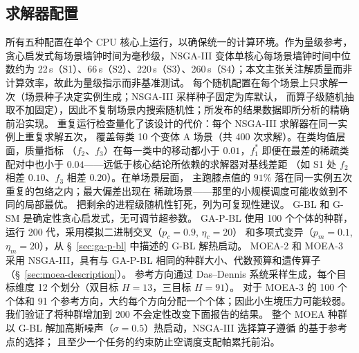\documentclass[preprint,12pt,authoryear]{elsarticle}
\begin{document}
\subsection{求解器配置}
所有五种配置在单个 CPU 核心上运行，以确保统一的计算环境。作为量级参考，贪心启发式每场景墙钟时间为毫秒级，NSGA-III 变体单核心每场景墙钟时间中位数约为 22\,s（S1）、66\,s（S2）、220\,s（S3）、260\,s（S4）；本文主张关注解质量而非计算效率，故此为量级指示而非基准测试。
每个随机配置在每个场景上只求解一次（场景种子决定实例生成；NSGA-III 采样种子固定为库默认，
而算子级随机抽取不加固定），因此不复制场景内搜索随机性；所发布的结果数据即所分析的精确前沿实现。
重复运行检查量化了该设计的代价：每个 NSGA-III 求解器在同一实例上重复求解五次，
覆盖每类 10 个变体 A 场景（共 400 次求解）。在类均值层面，质量指标
（$f_2$、$f_3$）在每一类中的移动都小于 $0.01$，$f_1^*$ 即便在最差的稀疏类
配对中也小于 $0.04$——远低于核心结论所依赖的求解器对基线差距
（如 S1 处 $f_2$ 相差 $0.10$、$f_3$ 相差 $0.20$）。在单场景层面，
主跑膝点值的 $91\%$ 落在同一实例五次重复的包络之内；最大偏差出现在
稀疏场景——那里的小规模调度可能收敛到不同的局部最优。
把剩余的进程级随机性钉死，列为可复现性建议。
G-BL 和 G-SM 是确定性贪心启发式，无可调节超参数。
GA-P-BL 使用 100 个个体的种群，运行 200 代，采用模拟二进制交叉（$p_c = 0.9$, $\eta_c = 20$）
和多项式变异（$p_m = 0.1$, $\eta_m = 20$），从 \S~\ref{sec:ga-p-bl} 中描述的 G-BL 解热启动。
MOEA-2 和 MOEA-3 采用 NSGA-III，具有与 GA-P-BL 相同的种群大小、代数预算和遗传算子（\S~\ref{sec:moea-description}）。
参考方向通过 Das--Dennis 系统采样生成，每个目标维度 12 个划分（双目标 $H = 13$，三目标 $H = 91$）。
对于 MOEA-3 的 100 个个体和 91 个参考方向，大约每个方向分配一个个体；因此小生境压力可能较弱。
我们验证了将种群增加到 200 不会定性改变下面报告的结果。
整个 MOEA 种群以 G-BL 解加高斯噪声（$\sigma = 0.5$）热启动，NSGA-III 选择算子遵循 \citet{Deb2014} 的基于参考点的选择；
且至少一个任务的约束防止空调度支配帕累托前沿。
\end{document}
